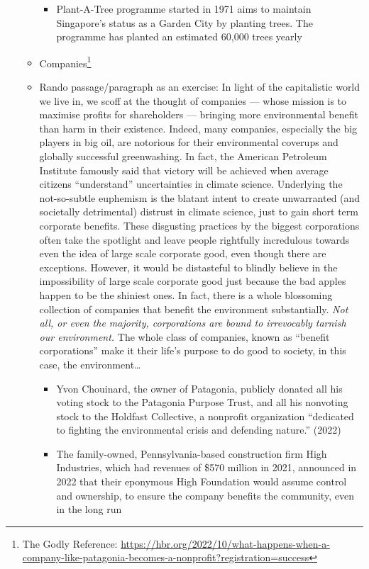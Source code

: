 \documentclass[oneside]{book}
\begin{document}
\begin{enumerate}
\begin{itemize}
\begin{itemize}
            \item Plant-A-Tree programme started in 1971 aims to maintain Singapore's status as a Garden City by planting trees. The programme has planted an estimated 60,000 trees yearly
        \end{itemize}
        \item Companies\footnote{The Godly Reference: \url{https://hbr.org/2022/10/what-happens-when-a-company-like-patagonia-becomes-a-nonprofit?registration=success}}
        \item Rando passage/paragraph as an exercise: In light of the capitalistic world we live in, we scoff at the thought of companies --- whose mission is to maximise profits for shareholders --- bringing more environmental benefit than harm in their existence. Indeed, many companies, especially the big players in big oil, are notorious for their environmental coverups and globally successful greenwashing. In fact, the American Petroleum Institute famously said that victory will be achieved when average citizens ``understand'' uncertainties in climate science. Underlying the not-so-subtle euphemism is the blatant intent to create unwarranted (and societally detrimental) distrust in climate science, just to gain short term corporate benefits. These disgusting practices by the biggest corporations often take the spotlight and leave people rightfully incredulous towards even the idea of large scale corporate good, even though there are exceptions. However, it would be distasteful to blindly believe in the impossibility of large scale corporate good just because the bad apples happen to be the shiniest ones. In fact, there is a whole blossoming collection of companies that benefit the environment substantially. \emph{Not all, or even the majority, corporations are bound to irrevocably tarnish our environment.} The whole class of companies, known as ``benefit corporations'' make it their life's purpose to do good to society, in this case, the environment\ldots
        \begin{itemize}
            \item Yvon Chouinard, the owner of Patagonia, publicly donated all his voting stock to the Patagonia Purpose Trust, and all his nonvoting stock to the Holdfast Collective, a nonprofit organization “dedicated to fighting the environmental crisis and defending nature.” (2022)
            \item The family-owned, Pennsylvania-based construction firm High Industries, which had revenues of \$570 million in 2021, announced in 2022 that their eponymous High Foundation would assume control and ownership, to ensure the company benefits the community, even in the long run

\end{itemize}
\end{itemize}
\end{enumerate}
\end{document}

